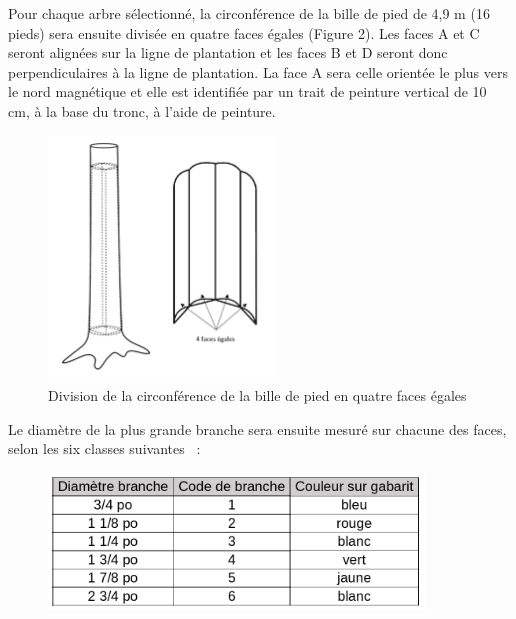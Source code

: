 \documentclass[letterpaper, 12pt]{article}
\begin{document}
\begin{onehalfspace}
Pour chaque arbre sélectionné, la circonférence de la bille de pied de 4,9 m (16 pieds) sera ensuite divisée en quatre faces égales (Figure 2). Les faces A et C seront alignées sur la ligne de plantation et les faces B et D seront donc perpendiculaires à la ligne de plantation. La face A sera celle orientée le plus vers le nord magnétique et elle est identifiée par un trait de peinture vertical de 10 cm, à la base du tronc, à l’aide de peinture.

\vspace{12pt}

\begin{figure}[H]
	\centering
	\includegraphics[width=6cm]{Figure2}
	\caption{Division de la circonférence de la bille de pied en quatre faces égales}
\end{figure}

\vspace{12pt}

Le diamètre de la plus grande branche sera ensuite mesuré sur chacune des faces, selon les six classes suivantes %
 :

\begin{figure}[H]
	\centering
	\includegraphics[width=10cm]{Code}
\end{figure}


\end{onehalfspace}
\end{document}
